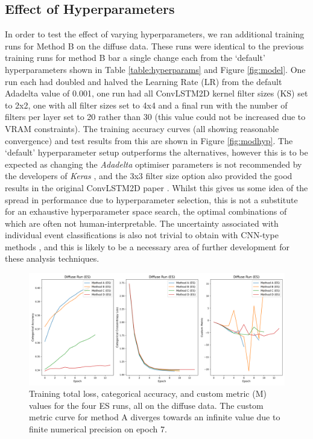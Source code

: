 \subsection{Effect of Hyperparameters}
In order to test the effect of varying hyperparameters, we ran additional training runs for Method B on the diffuse data. These runs were identical to the previous training runs for method B bar a single change each from the `default' hyperparameters shown in Table \ref{table:hyperparams} and Figure \ref{fig:model}. One run each had doubled and halved the Learning Rate (LR) from the default Adadelta value of 0.001, one run had all ConvLSTM2D kernel filter sizes (KS) set to 2x2, one with all filter sizes set to 4x4 and a final run with the number of filters per layer set to 20 rather than 30 (this value could not be increased due to VRAM constraints). The training accuracy curves (all showing reasonable convergence) and test results from this are shown in Figure \ref{fig:modhyp}. The `default' hyperparameter setup outperforms the alternatives, however this is to be expected as changing the \textit{Adadelta} optimiser parameters is not recommended by the developers of \textit{Keras} \cite{Keras}, and the 3x3 filter size option also provided the good results in the original ConvLSTM2D paper \cite{shi}. Whilst this gives us some idea of the spread in performance due to hyperparameter selection, this is not a substitute for an exhaustive hyperparameter space search, the optimal combinations of which are often not human-interpretable. The uncertainty associated with individual event classifications is also not trivial to obtain with CNN-type methods \cite{mike} \cite{gal2015}, and this is likely to be a necessary area of further development for these analysis techniques.

 \begin{figure}[t]
  \centering
  \includegraphics[width=\textwidth]{figures/trainlogES.png}
  \caption{Training total loss, categorical accuracy, and custom metric (M) values for the four ES runs, all on the diffuse data. The custom metric curve for method A diverges towards an infinite value due to finite numerical precision on epoch 7.
  }
  \label{fig:trainlogES}
\end{figure}

